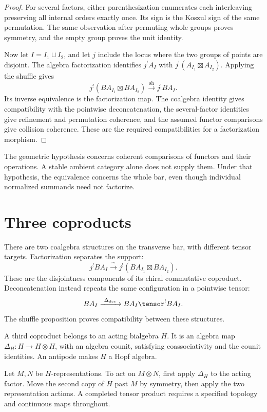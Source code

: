 \begin{proof}
For several factors, either parenthesization enumerates each interleaving preserving all internal orders exactly once. Its sign is the Koszul sign of the same permutation. The same observation after permuting whole groups proves symmetry, and the empty group proves the unit identity.

Now let $I=I_1\sqcup I_2$, and let $j$ include the locus where the two groups of points are disjoint. The algebra factorization identifies $j^!A_I$ with $j^!(A_{I_1}\boxtimes A_{I_2})$. Applying the shuffle gives
\[
 j^!(BA_{I_1}\boxtimes BA_{I_2})
       \xrightarrow{\ \operatorname{sh}\ }j^!BA_I.
\]
Its inverse equivalence is the factorization map. The coalgebra identity gives compatibility with the pointwise deconcatenation, the several-factor identities give refinement and permutation coherence, and the assumed functor comparisons give collision coherence. These are the required compatibilities for a factorization morphism.
\end{proof}

The geometric hypothesis concerns coherent comparisons of functors and their operations. A stable ambient category alone does not supply them. Under that hypothesis, the equivalence concerns the whole bar, even though individual normalized summands need not factorize.

\section{Three coproducts}
There are two coalgebra structures on the transverse bar, with different tensor targets. Factorization separates the support:
\[
 j^!BA_I\xrightarrow{\ \sim\ }
       j^!(BA_{I_1}\boxtimes BA_{I_2}).
\]
These are the disjointness components of its chiral commutative coproduct. Deconcatenation instead repeats the same configuration in a pointwise tensor:
\[
 BA_I\xrightarrow{\ \Delta_{\mathrm{dec}}\ }
       BA_I\tensor^!BA_I.
\]
The shuffle proposition proves compatibility between these structures.

A third coproduct belongs to an acting bialgebra $H$. It is an algebra map $\Delta_H:H\to H\otimes H$, with an algebra counit, satisfying coassociativity and the counit identities. An antipode makes $H$ a Hopf algebra.

Let $M,N$ be $H$-representations. To act on $M\otimes N$, first apply $\Delta_H$ to the acting factor. Move the second copy of $H$ past $M$ by symmetry, then apply the two representation actions. A completed tensor product requires a specified topology and continuous maps throughout.

